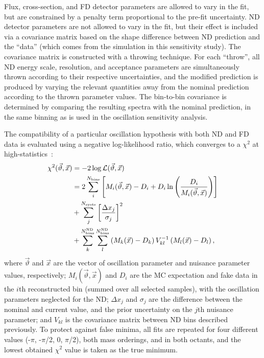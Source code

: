 Flux, cross-section, and FD detector parameters are allowed to vary in the fit, but are constrained by a penalty term proportional to the pre-fit uncertainty. ND detector parameters are not allowed to vary in the fit, but their effect is included via a covariance matrix based on the shape difference between ND prediction and the ``data'' (which comes from the simulation in this sensitivity study). The covariance matrix is constructed with a throwing technique. For each ``throw'', all ND energy scale, resolution, and acceptance parameters are simultaneously thrown according to their respective uncertainties, and the modified prediction is produced by varying the relevant quantities away from the nominal prediction according to the thrown parameter values. The bin-to-bin covariance is determined by comparing the resulting spectra with the nominal prediction, in the same binning as is used in the oscillation sensitivity analysis.

The compatibility of a particular oscillation hypothesis with both ND and FD data is evaluated using a negative log-likelihood ratio, which converges to a $\chi^{2}$ at high-statistics~\cite{Tanabashi:2018oca}:
\begin{equation}
\begin{aligned}
  \chi^2(\vec{\vartheta}, \vec{x}) &= -2\log\mathcal{L}(\vec{\vartheta}, \vec{x}) \\
  &= 2\sum_i^{N_{\rm bins}}\left[ M_i(\vec{\vartheta}, \vec{x})-D_i+D_i\ln\left({D_i\over M_i(\vec{\vartheta}, \vec{x})}\right) \right] \\
  &+ \sum_{j}^{N_{\mathrm{systs}}}\left[ \frac{\Delta x_{j}}{\sigma_{j}} \right]^{2} \\
  &+ \sum^{N^{\mathrm{ND}}_{\mathrm{bins}}}_{k}\sum^{N^{\mathrm{ND}}_{\mathrm{bins}}}_{l} \left(M_k(\vec{x})-D_k \right) V^{-1}_{kl}\left(M_l(\vec{x})-D_l \right),
\end{aligned}
\label{eq:chisq}
\end{equation}
where $\vec{\vartheta}$ and $\vec{x}$ are the vector of oscillation parameter and nuisance parameter values, respectively; $M_i(\vec{\vartheta}, \vec{x})$ and $D_{i}$ are the MC expectation and fake data in the $i$th reconstructed bin (summed over all selected samples), with the oscillation parameters neglected for the ND; $\Delta x_{j}$ and $\sigma_{j}$ are the difference between the nominal and current value, and the prior uncertainty on the $j$th nuisance parameter; and $V_{kl}$ is the covariance matrix between ND bins described previously. To protect against false minima, all fits are repeated for four different \deltacp values (-$\pi$, -$\pi$/2, 0, $\pi$/2), both mass orderings, and in both  octants, and the lowest obtained $\chi^{2}$ value is taken as the true minimum.

